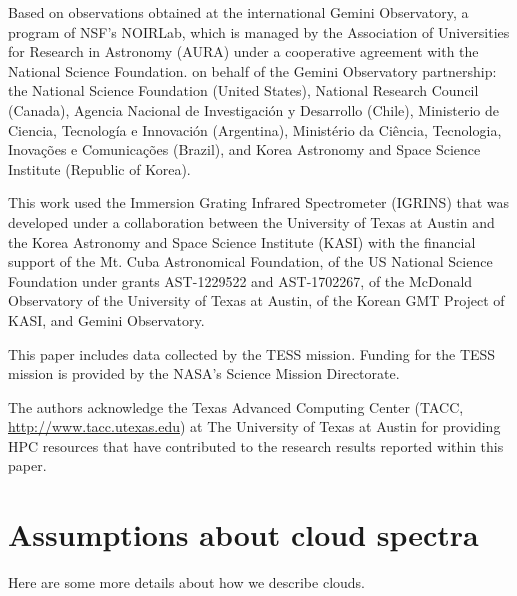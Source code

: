 \documentclass[modern]{aastex631}
\begin{document}
\begin{acknowledgements}
Based on observations obtained at the international Gemini Observatory, a program of NSF’s NOIRLab, which is managed by the Association of Universities for Research in Astronomy (AURA) under a cooperative agreement with the National Science Foundation. on behalf of the Gemini Observatory partnership: the National Science Foundation (United States), National Research Council (Canada), Agencia Nacional de Investigaci\'{o}n y Desarrollo (Chile), Ministerio de Ciencia, Tecnolog\'{i}a e Innovaci\'{o}n (Argentina), Minist\'{e}rio da Ci\^{e}ncia, Tecnologia, Inova\c{c}\~{o}es e Comunica\c{c}\~{o}es (Brazil), and Korea Astronomy and Space Science Institute (Republic of Korea).

This work used the Immersion Grating Infrared Spectrometer (IGRINS) that was developed under a collaboration between the University of Texas at Austin and the Korea Astronomy and Space Science Institute (KASI) with the financial support of the Mt. Cuba Astronomical Foundation, of the US National Science Foundation under grants AST-1229522 and AST-1702267, of the McDonald Observatory of the University of Texas at Austin, of the Korean GMT Project of KASI, and Gemini Observatory.

This paper includes data collected by the TESS mission. Funding for the TESS mission is provided by the NASA's Science Mission Directorate.

The authors acknowledge the Texas Advanced Computing Center (TACC, \url{http://www.tacc.utexas.edu}) at The University of Texas at Austin for providing HPC resources that have contributed to the research results reported within this paper.
\end{acknowledgements}

\clearpage








\clearpage

\appendix
\restartappendixnumbering

\section{Assumptions about cloud spectra} \label{appendix:clouds}

Here are some more details about how we describe clouds.
\end{document}
